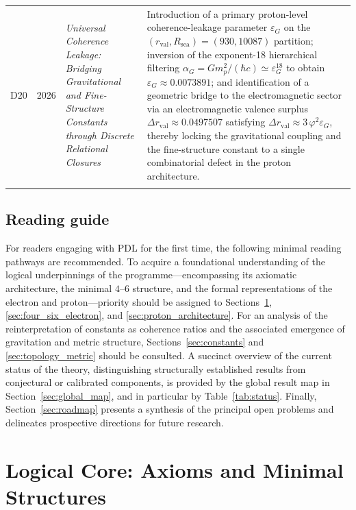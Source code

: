 \documentclass{article}
\begin{document}
\begin{longtable}{@{}llL{4cm}p{9.5cm}@{}}
D20 & 2026 &
\textit{Universal Coherence Leakage: Bridging Gravitational and Fine-Structure Constants through Discrete Relational Closures} &
Introduction of a primary proton-level coherence-leakage parameter $\varepsilon_G$ on the
$(r_{\mathrm{val}},R_{\mathrm{sea}})=(930,10087)$ partition; inversion of the exponent-18 hierarchical filtering
$\alpha_G = G m_p^2 / (\hbar c) \simeq \varepsilon_G^{18}$ to obtain $\varepsilon_G \approx 0.0073891$; and
identification of a geometric bridge to the electromagnetic sector via an electromagnetic valence surplus
$\Delta r_{\mathrm{val}} \approx 0.0497507$ satisfying $\Delta r_{\mathrm{val}} \approx 3\,\varphi^2 \varepsilon_G$, thereby
locking the gravitational coupling and the fine-structure constant to a single combinatorial defect in the
proton architecture.\citep{Universal_Coherence_Leakage_2026} \\\\[0.5em]

\bottomrule
\end{longtable}

\subsection*{Reading guide}

For readers engaging with PDL for the first time, the following minimal reading pathways are recommended. To acquire a foundational understanding of the logical underpinnings of the programme—encompassing its axiomatic architecture, the minimal $4$–$6$ structure, and the formal representations of the electron and proton—priority should be assigned to Sections~\ref{sec:logical_core}, \ref{sec:four_six_electron}, and \ref{sec:proton_architecture}. For an analysis of the reinterpretation of constants as coherence ratios and the associated emergence of gravitation and metric structure, Sections~\ref{sec:constants} and \ref{sec:topology_metric} should be consulted. A succinct overview of the current status of the theory, distinguishing structurally established results from conjectural or calibrated components, is provided by the global result map in Section~\ref{sec:global_map}, and in particular by Table~\ref{tab:status}. Finally, Section~\ref{sec:roadmap} presents a synthesis of the principal open problems and delineates prospective directions for future research.

\section{Logical Core: Axioms and Minimal Structures}
\label{sec:logical_core}
\end{document}
